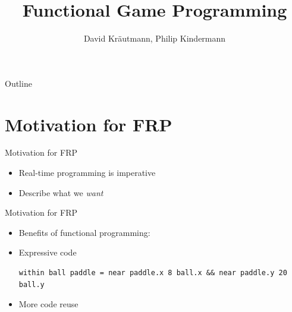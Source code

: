 \documentclass{beamer}
\title{Functional Game Programming}
\author{David Kr\"{a}utmann, Philip Kindermann}
\institute{RWTH Aachen}
\begin{document}
    
    \begin{frame}
      \titlepage
    \end{frame}
    
\begin{frame}{Outline}
  \tableofcontents
\end{frame}
    
    \section{Motivation for FRP}
    \begin{frame}{Motivation for FRP}
        \begin{itemize}
            \item Real-time programming is imperative
            \begin{figure}[ht]
            \end{figure}
            \item Describe what we \emph{want}
        \end{itemize}
    \end{frame}
    
\begin{frame}[fragile]{Motivation for FRP}
        \begin{itemize}
            \item<+-> Benefits of functional programming:
            \item<+-> Expressive code
            \begin{verbatim}
within ball paddle = near paddle.x 8 ball.x && near paddle.y 20 ball.y
            \end{verbatim}
            \item<+-> More code reuse
        \end{itemize}
\end{frame}
    
\end{document}
